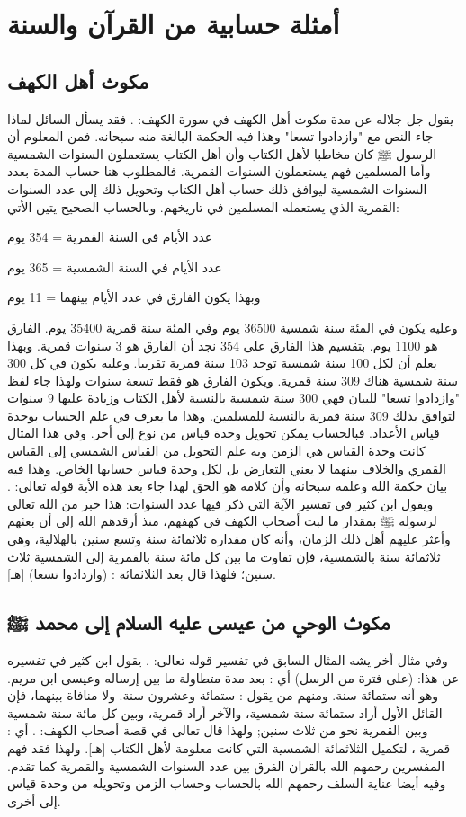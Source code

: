 \section{أمثلة حسابية من القرآن والسنة}
\subsection{مكوث أهل الكهف}
يقول جل جلاله عن مدة مكوث أهل الكهف في سورة الكهف:
\quranayah*[18][25]{\footnotesize \surahname*[18]}. فقد يسأل السائل لماذا جاء النص مع "وازدادوا تسعا" وهذا فيه الحكمة البالغة منه سبحانه. فمن المعلوم أن الرسول ﷺ كان مخاطبا لأهل الكتاب وأن أهل الكتاب يستعملون السنوات الشمسية وأما المسلمين فهم يستعملون السنوات القمرية. فالمطلوب هنا حساب المدة بعدد السنوات الشمسية ليوافق ذلك حساب أهل الكتاب وتحويل ذلك إلى عدد السنوات القمرية الذي يستعمله المسلمين في تاريخهم. وبالحساب الصحيح يتين الأتي:

عدد الأيام في السنة القمرية = 354 يوم

عدد الأيام في السنة الشمسية = 365 يوم

وبهذا يكون الفارق في عدد الأيام بينهما = 11 يوم

وعليه يكون في المئة سنة شمسية 36500 يوم وفي المئة سنة قمرية 35400 يوم.
الفارق هو  1100 يوم. بتقسيم هذا الفارق على 354 نجد أن الفارق هو 3 سنوات قمرية. وبهذا يعلم أن لكل 100 سنة شمسية توجد 103 سنة قمرية تقريبا. وعليه يكون في كل 300 سنة شمسية هناك 309 سنة قمرية. ويكون الفارق هو فقط تسعة سنوات ولهذا جاء لفظ "وازدادوا تسعا" للبيان فهي 300 سنة شمسية بالنسبة لأهل الكتاب وزيادة عليها 9 سنوات لتوافق بذلك 309 سنة قمرية بالنسبة للمسلمين. وهذا ما يعرف في علم الحساب بوحدة قياس الأعداد. فبالحساب يمكن تحويل وحدة قياس من نوع إلى أخر. وفي هذا المثال كانت وحدة القياس هي الزمن وبه علم التحويل من القياس الشمسي إلى القياس القمري والخلاف بينهما لا يعني التعارض بل لكل وحدة قياس حسابها الخاص. وهذا فيه بيان حكمة الله وعلمه سبحانه وأن كلامه هو الحق لهذا جاء بعد هذه الأية قوله تعالى:
\quranayah*[18][26]{\footnotesize \surahname*[18]}.
ويقول ابن كثير في تفسير الآية التي ذكر فيها عدد السنوات:
هذا خبر من الله تعالى لرسوله ﷺ بمقدار ما لبث أصحاب الكهف في كهفهم، منذ أرقدهم الله إلى أن بعثهم وأعثر عليهم أهل ذلك الزمان، وأنه كان مقداره ثلاثمائة سنة وتسع سنين بالهلالية، وهي ثلاثمائة سنة بالشمسية، فإن تفاوت ما بين كل مائة سنة بالقمرية إلى الشمسية ثلاث سنين؛ فلهذا قال بعد الثلاثمائة : (وازدادوا تسعا) [هـ].

\subsection{مكوث الوحي من عيسى عليه السلام إلى محمد ﷺ}
وفي مثال أخر يشه المثال السابق في تفسير قوله تعالى:
\quranayah*[5][19]{\footnotesize \surahname*[5]}. يقول ابن كثير في تفسيره عن هذا: (على فترة من الرسل) أي : بعد مدة متطاولة ما بين إرساله وعيسى ابن مريم.
وهو أنه ستمائة سنة. ومنهم من يقول : ستمائة وعشرون سنة. ولا منافاة بينهما، فإن القائل الأول أراد ستمائة سنة شمسية، والآخر أراد قمرية، وبين كل مائة سنة شمسية وبين القمرية نحو من ثلاث سنين; ولهذا قال تعالى في قصة أصحاب الكهف:
\quranayah*[18][25]{\footnotesize \surahname*[18]}. أي : قمرية ، لتكميل الثلاثمائة الشمسية التي كانت معلومة لأهل الكتاب
[هـ]. ولهذا فقد فهم المفسرين رحمهم الله بالقران الفرق بين عدد السنوات الشمسية والقمرية كما تقدم. وفيه أيضا عناية السلف رحمهم الله بالحساب وحساب الزمن وتحويله من وحدة قياس إلى أخرى.

